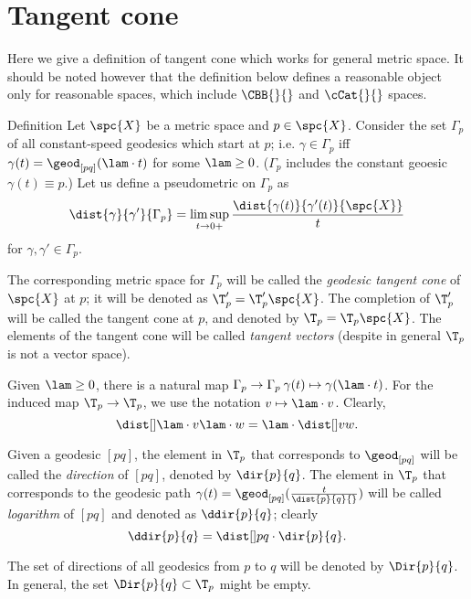 \section{Tangent cone}\label{sec:tan}

Here we give a definition of tangent cone which works for general metric space.
It should be noted however that the definition below defines a reasonable object only for reasonable spaces, which include $\CBB{}{}$ and $\cCat{}{}$ spaces.

\begin{thm}{Definition}\label{def:tan}
Let $\spc{X}$ be a metric space and $p\in\spc{X}$.
Consider the set $\Gamma_p$ of all constant-speed geodesics which start at $p$;
i.e. $\gamma\in\Gamma_p$ iff $\gamma(t)=\geod_{[pq]}(\lam\cdot t)$ for some $\lam\ge0$.
($\Gamma_p$ includes the constant geoesic $\gamma(t)\equiv p$.)
Let us define a pseudometric on $\Gamma_p$ as
\[\dist{\gamma}{\gamma'}{\Gamma_p}
=
\limsup_{t\to0+}\frac{\dist{\gamma(t)}{\gamma'(t)}{\spc{X}}}{t}\]
for $\gamma,\gamma'\in\Gamma_p$.

The corresponding metric space  for $\Gamma_p$ will be called the \emph{geodesic tangent cone} of $\spc{X}$ at $p$; 
it will be denoted as $\T_p'=\T_p'\spc{X}$.
The completion of $\T_p'$ will be called the tangent cone at $p$, and denoted by $\T_p=\T_p\spc{X}$.
The elements of the  tangent cone will be called \emph{tangent vectors}
(despite in general $\T_p$ is not a vector space).
\end{thm}

Given $\lam\ge0$, there is a natural map $\Gamma_p\to\Gamma_p\:\gamma(t)\mapsto\gamma(\lam\cdot t)$.
For the induced map $\T_p\to\T_p$, we use the notation $v\mapsto \lam\cdot v$.
Clearly, 
\[\dist[{{}}]{\lam\cdot v}{\lam\cdot w}{}=\lam\cdot\dist[{{}}]{v}{w}{}.\]

Given a geodesic $[p q]$, 
the element in $\T_p$ that corresponds to $\geod_{[p q]}$ 
will be called the \emph{direction} of $[p q]$, denoted by $\dir{p}{q}$\index{$\dir{*}{*}$}.
The element in $\T_p$ that corresponds to the geodesic path $\gamma(t)=\geod_{[p q]}(\tfrac{t}{\dist{p}{q}{}})$ 
will be called \emph{logarithm} of $[p q]$ and denoted as $\ddir{p}{q}$\index{$\dir{*}{*}$};
clearly 
\[\ddir{p}{q}=\dist[{{}}]{p}{q}{}\cdot\dir{p}{q}.\]

The set of directions of all geodesics from $p$ to $q$ will be denoted by $\Dir{p}{q}$\index{$\Dir{{*}}{{*}}$}.
In general, the set $\Dir{p}{q}\subset\T_p$ might be empty.


